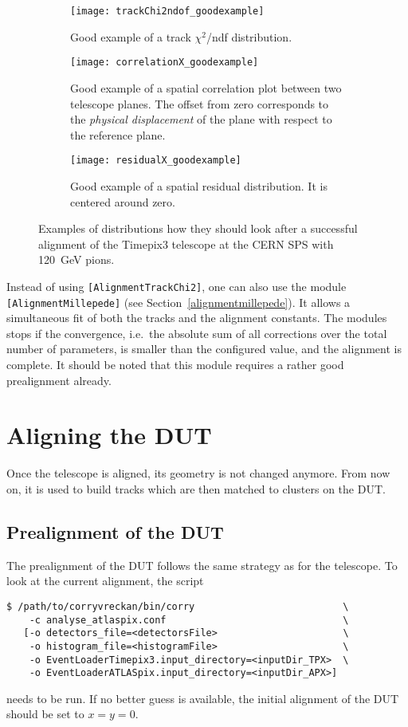 \begin{figure}
    \centering
    \begin{subfigure}[t]{0.66\textwidth}
        \texttt{[image: trackChi2ndof\_goodexample]}
        \caption{Good example of a track $\chi^2$/ndf distribution.}
        \label{fig:trackChi2}
    \end{subfigure}
    \begin{subfigure}[t]{0.66\textwidth}
        \texttt{[image: correlationX\_goodexample]}
        \caption{Good example of a spatial correlation plot between two telescope planes. The offset from zero corresponds to the \emph{physical displacement} of the plane  with respect to the reference plane.}
        \label{fig:correlationX}
    \end{subfigure}
    \begin{subfigure}[t]{0.66\textwidth}
        \texttt{[image: residualX\_goodexample]}
        \caption{Good example of a spatial residual distribution. It is centered around zero.}
        \label{fig:residualX}
    \end{subfigure}
    \caption{Examples of distributions how they should look after a successful alignment of the Timepix3 telescope at the CERN SPS with \SI{120}{\GeV} pions.}
    \label{fig:exampleAlignment}
\end{figure}

Instead of using \texttt{[AlignmentTrackChi2]}, one can also use the module \texttt{[AlignmentMillepede]} (see Section~\ref{alignmentmillepede}).
It allows a simultaneous fit of both the tracks and the alignment constants.
The modules stops if the convergence, i.e.\ the absolute sum of all corrections over the total number of parameters, is smaller than the configured value, and the alignment is complete.
It should be noted that this module requires a rather good prealignment already.

\section{Aligning the DUT}
\label{sec:align_dut}
Once the telescope is aligned, its geometry is not changed anymore. From now on, it is used to build tracks which are then matched to clusters on the DUT.

\subsection*{Prealignment of the DUT}
The prealignment of the DUT follows the same strategy as for the telescope. To look at the current alignment, the script
\begin{verbatim}
$ /path/to/corryvreckan/bin/corry                          \
    -c analyse_atlaspix.conf                               \
   [-o detectors_file=<detectorsFile>                      \
    -o histogram_file=<histogramFile>                      \
    -o EventLoaderTimepix3.input_directory=<inputDir_TPX>  \
    -o EventLoaderATLASpix.input_directory=<inputDir_APX>]
\end{verbatim}
needs to be run.
If no better guess is available, the initial alignment of the DUT should be set to $x=y=0$.

